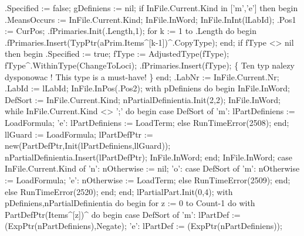    .Specified := false;
   gDefiniens := nil;
   if InFile.Current.Kind in ['m','e'] then
   begin
      .MeansOccurs := InFile.Current.Kind;
      InFile.InWord;
      InFile.InInt(lLabId);
      .Pos1 := CurPos;
      .fPrimaries.Init(.Length,1);
      for k := 1 to .Length do
      begin
         .fPrimaries.Insert(TypPtr(aPrim.Items^[k-1])^.CopyType);
      end;
      if fType <> nil then
      begin
         .Specified := true;
         fType := AdjustedType(fType);
         fType^.WithinType(ChangeToLoci);
         .fPrimaries.Insert(fType);
         \{ Ten typ nalezy dysponowac !
           This type is a must-have! \}
      end;
      .LabNr := InFile.Current.Nr;
      .LabId :=  lLabId;
      InFile.InPos(.Pos2);
      with pDefiniens do
      begin
         InFile.InWord; DefSort := InFile.Current.Kind;
         nPartialDefinientia.Init(2,2);
         InFile.InWord;
         while InFile.Current.Kind <> ';' do
         begin
            case DefSort of
               'm': lPartDefiniens := LoadFormula;
               'e': lPartDefiniens := LoadTerm;
               else RunTimeError(2508);
            end;
            llGuard := LoadFormula;
            lPartDefPtr := new(PartDefPtr,Init(lPartDefiniens,llGuard));
            nPartialDefinientia.Insert(lPartDefPtr);
            InFile.InWord;
         end;
         InFile.InWord;
         case InFile.Current.Kind of
            'n': nOtherwise := nil;
            'o':
               case DefSort of
                  'm': nOtherwise := LoadFormula;
                  'e': nOtherwise := LoadTerm;
                  else RunTimeError(2509);
               end;
            else RunTimeError(2520);
         end;
      end;
      lPartialPart.Init(0,4);
      with pDefiniens,nPartialDefinientia do
      begin
         for z := 0 to Count-1 do
            with PartDefPtr(Items^[z])^ do
         begin
            case DefSort of
               'm': lPartDef := (ExpPtr(nPartDefiniens),Negate);
               'e': lPartDef := (ExpPtr(nPartDefiniens));
